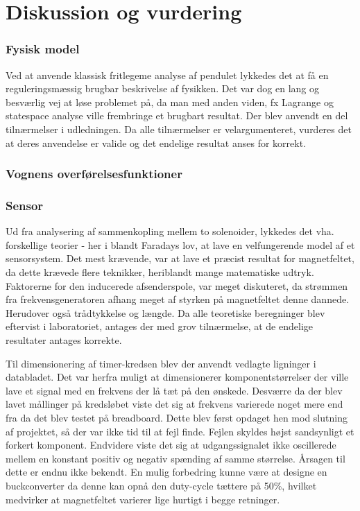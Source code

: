 \chapter{Diskussion og vurdering}\label{kap:diskussion}

\subsection{Fysisk model}
Ved at anvende klassisk fritlegeme analyse af pendulet lykkedes det at få en reguleringsmæssig brugbar beskrivelse af fysikken. 
Det var dog en lang og besværlig vej at løse problemet på, da man med anden viden, fx Lagrange og statespace analyse ville frembringe et brugbart resultat.
Der blev anvendt en del tilnærmelser i udledningen. 
Da alle tilnærmelser er velargumenteret, vurderes det at deres anvendelse er valide og det endelige resultat anses for korrekt.   

\subsection{Vognens overførelsesfunktioner}

\subsection{Sensor}
Ud fra analysering af sammenkopling mellem to solenoider, lykkedes det vha. forskellige teorier - her i blandt Faradays lov, at lave en velfungerende model af et sensorsystem. 
Det mest krævende, var at lave et præcist resultat for magnetfeltet, da dette krævede flere teknikker, heriblandt mange matematiske udtryk.
Faktorerne for den inducerede afsenderspole, var meget diskuteret, da strømmen fra frekvensgeneratoren afhang meget af styrken på magnetfeltet denne dannede.
Herudover også trådtykkelse og længde. 
Da alle teoretiske beregninger blev eftervist i laboratoriet, antages der med grov tilnærmelse, at de endelige resultater antages korrekte.


Til dimensionering af timer-kredsen blev der anvendt vedlagte ligninger i databladet.
Det var herfra muligt at dimensionerer komponentstørrelser der ville lave et signal med en frekvens der lå tæt på den ønskede.
Desværre da der blev lavet mållinger på kredsløbet viste det sig at frekvens varierede noget mere end fra da det blev testet på breadboard.
Dette blev først opdaget hen mod slutning af projektet, så der var ikke tid til at fejl finde.
Fejlen skyldes højst sandsynligt et forkert komponent.
Endvidere viste det sig at udgangssignalet ikke oscillerede mellem en konstant positiv og negativ spænding af samme størrelse.
Årsagen til dette er endnu ikke bekendt.
En mulig forbedring kunne være at designe en buckconverter da denne kan opnå den duty-cycle tættere på 50\%, hvilket medvirker at magnetfeltet varierer lige hurtigt i begge retninger.

